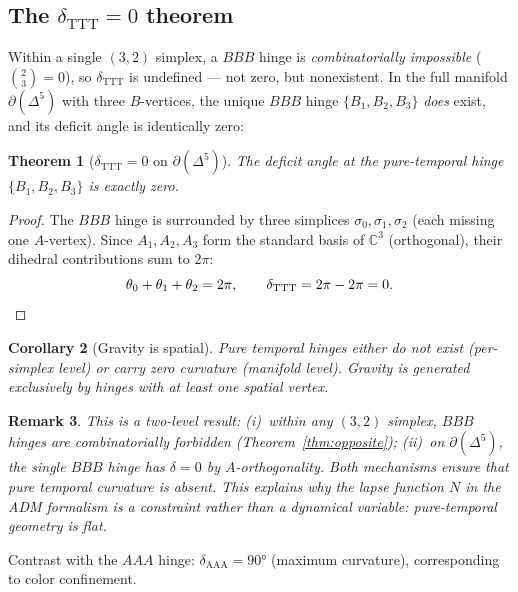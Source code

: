 \documentclass[12pt,a4paper]{article}
\newtheorem{theorem}{Theorem}[section]
\newtheorem{corollary}[theorem]{Corollary}
\newtheorem{remark}[theorem]{Remark}
\newcommand{\CC}{\mathbb{C}}
\begin{document}
\subsection{The $\delta_{\mathrm{TTT}} = 0$ theorem}
\label{subsec:ttt}

Within a single $(3,2)$ simplex, a $BBB$ hinge is
\emph{combinatorially impossible} ($\binom{2}{3} = 0$),
so $\delta_{\mathrm{TTT}}$ is undefined ---
not zero, but nonexistent.
In the full manifold $\partial(\Delta^5)$ with three
$B$-vertices, the unique $BBB$ hinge $\{B_1,B_2,B_3\}$
\emph{does} exist, and its deficit angle is identically zero:

\begin{theorem}[$\delta_{\mathrm{TTT}} = 0$ on $\partial(\Delta^5)$]
\label{thm:ttt}
The deficit angle at the pure-temporal hinge
$\{B_1,B_2,B_3\}$ is exactly zero.
\end{theorem}

\begin{proof}
The $BBB$ hinge is surrounded by three simplices
$\sigma_0,\sigma_1,\sigma_2$ (each missing one $A$-vertex).
Since $A_1,A_2,A_3$ form the standard basis of $\CC^3$
(orthogonal), their dihedral contributions sum to $2\pi$:
\begin{equation}
\theta_0 + \theta_1 + \theta_2 = 2\pi,
\qquad \delta_{\mathrm{TTT}} = 2\pi - 2\pi = 0.
\qedhere
\end{equation}
\end{proof}

\begin{corollary}[Gravity is spatial]
Pure temporal hinges either do not exist (per-simplex level)
or carry zero curvature (manifold level).
Gravity is generated exclusively by hinges with at least
one spatial vertex.
\end{corollary}

\begin{remark}
This is a two-level result:
\emph{(i)}~within any $(3,2)$ simplex, $BBB$ hinges are
combinatorially forbidden (Theorem~\ref{thm:opposite});
\emph{(ii)}~on $\partial(\Delta^5)$, the single $BBB$ hinge
has $\delta = 0$ by $A$-orthogonality.
Both mechanisms ensure that pure temporal curvature is absent.
This explains why the lapse function $N$ in the ADM formalism
is a constraint rather than a dynamical variable:
pure-temporal geometry is flat.
\end{remark}

Contrast with the $AAA$ hinge: $\delta_{\mathrm{AAA}} = 90°$
(maximum curvature), corresponding to color confinement.
\end{document}

